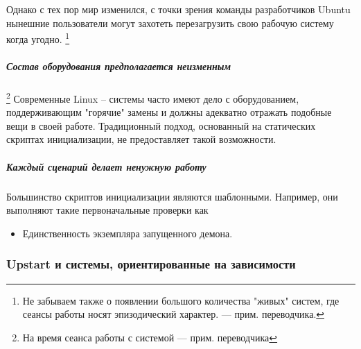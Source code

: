 Однако с тех пор мир изменился, с точки зрения команды разработчиков Ubuntu нынешние пользователи могут захотеть перезагрузить свою рабочую систему когда угодно. \footnote{Не забываем также о появлении большого количества "живых" систем, где сеансы работы носят эпизодический характер. --- прим. переводчика.}
\subparagraph{Состав оборудования предполагается неизменным}\footnote{На время сеанса работы с системой --- прим. переводчика}
Современные Linux -- системы часто имеют дело с оборудованием, поддерживающим "горячие" замены и должны адекватно отражать подобные вещи в своей работе. Традиционный подход, основанный на статических скриптах инициализации, не предоставляет такой возможности.
\subparagraph{Каждый сценарий делает ненужную работу} 
Большинство скриптов инициализации являются шаблонными. Например, они выполняют такие первоначальные проверки как \begin{itemize}
\item Единственность экземпляра запущенного демона.

\end{itemize}
\subsubsection{Upstart и системы, ориентированные на зависимости}